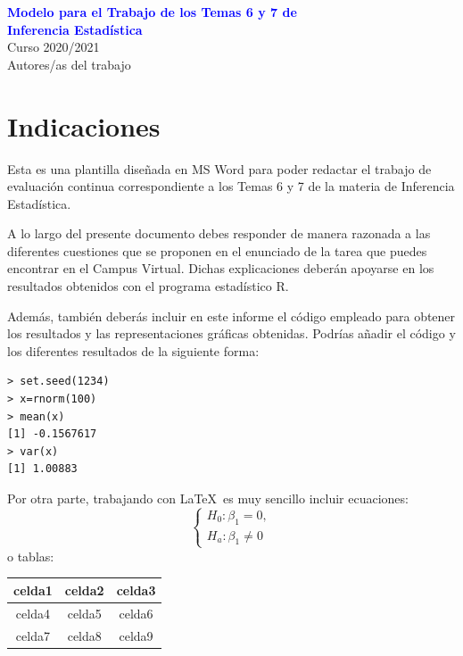 \documentclass[11pt]{article}
\begin{document}
\begin{center}
\textcolor{blue}{{\LARGE \textbf{Modelo para el Trabajo de los Temas 6 y 7 de\\[3mm] Inferencia Estadística }}}\\[3mm]
\Large{Curso 2020/2021 \\[3mm]
Autores/as del trabajo }
\end{center} 


\section{Indicaciones}
Esta es una plantilla diseñada en MS Word para poder redactar el trabajo de evaluación continua correspondiente a los Temas 6 y 7 de la materia de Inferencia Estadística.

A lo largo del presente documento debes responder de manera razonada a las diferentes cuestiones que se proponen en el enunciado de la tarea que puedes encontrar en el Campus Virtual. Dichas explicaciones deberán apoyarse en los resultados obtenidos con el programa estadístico R.

Además, también deberás incluir en este informe el código empleado para obtener los resultados y las representaciones gráficas obtenidas. Podrías añadir el código y los diferentes resultados de la siguiente forma:
\begin{verbatim}
> set.seed(1234)
> x=rnorm(100)
> mean(x)
[1] -0.1567617
> var(x)
[1] 1.00883
\end{verbatim}


Por otra parte, trabajando con \LaTeX\, es muy sencillo incluir ecuaciones:
$$
\begin{cases}
H_0: \beta_1=0,\\
H_a: \beta_1\neq 0
\end{cases}
$$
o tablas:
\begin{center}
\begin{tabular}{ |c c c| }
 \hline
 celda1 & celda2 & celda3 \\
 \hline \hline
 celda4 & celda5 & celda6 \\  
 celda7 & celda8 & celda9 \\   
  \hline
\end{tabular}
\end{center}
\end{document}
